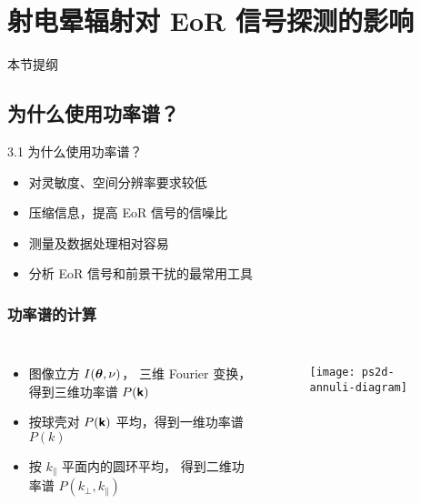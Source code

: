 \documentclass{beamer}
\begin{document}
\section{射电晕辐射对 EoR 信号探测的影响}

\begin{frame}
  \begin{block}{本节提纲}
    \vspace{2ex}
    \tableofcontents[
      sections=\value{section},
      sectionstyle=hide,
    ]
  \end{block}
\end{frame}

\subsection{为什么使用功率谱？}

\begin{frame}{3.1 为什么使用功率谱？}
  \begin{itemize}
    \item 对灵敏度、空间分辨率要求较低
    \item 压缩信息，提高 EoR 信号的信噪比
    \item 测量及数据处理相对容易
    \item 分析 EoR 信号和前景干扰的最常用工具
  \end{itemize}
\end{frame}

\begin{frame}[subsec]
  \frametitle{功率谱的计算}
  \begin{columns}[t,onlytextwidth]
    \begin{itemize}
      \item \alert{图像立方} $I(\bm{\mathsf{\theta}}, \nu)$，
        三维 Fourier 变换，得到\alert{三维功率谱} $P(\bm{\mathsf{k}})$
      \item 按球壳对 $P(\bm{\mathsf{k}})$ 平均，得到\alert{一维功率谱} $P(k)$
      \item 按 $k_{\parallel}$ 平面内的圆环平均，
        得到\alert{二维功率谱} $P(k_{\perp}, k_{\parallel})$
    \end{itemize}

    \begin{figure}
      \centering
      \texttt{[image: ps2d-annuli-diagram]}
    \end{figure}
  \end{columns}
\end{frame}
\end{document}
